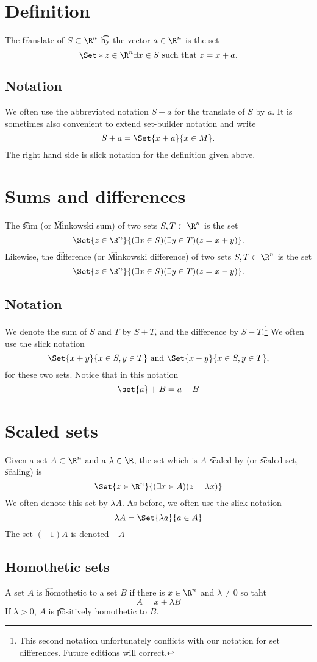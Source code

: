 
\section*{Definition}

The \t{translate} of $S \subset \R ^n$ \t{by} the vector $a \in \R ^n$ is the set
\[
\Set*{z \in \R ^n}{\exists x \in S \text{ such that } z = x + a}.
\]

\subsection*{Notation}

We often use the abbreviated notation $S + a$ for the translate of $S$ by $a$.
It is sometimes also convenient to extend set-builder notation and write
\[
S + a = \Set{x + a}{x \in M}.
\]
The right hand side is slick notation for the definition given above.

\section*{Sums and differences}

The \t{sum} (or \t{Minkowski sum}) of two sets $S, T \subset \R ^n$ is the set
\[
\Set{z \in \R ^n}{(\exists x \in S)(\exists y \in T)(z = x + y)}.
\]
Likewise, the \t{difference} (or \t{Minkowski difference}) of two sets $S, T \subset \R ^n$ is the set
\[
\Set{z \in \R ^n}{(\exists x \in S)(\exists y \in T)(z = x - y)}.
\]

\subsection*{Notation}

We denote the sum of $S$ and $T$ by $S + T$, and the difference by $S - T$.\footnote{This second notation unfortunately conflicts with our notation for set differences.
Future editions will correct.}
We often use the slick notation
\[
\Set{x + y}{x \in S, y \in T} \text{ and } \Set{x - y}{x \in S, y \in T},
\]
for these two sets.
Notice that in this notation
\[
\set{a} + B = a + B
\]

\section*{Scaled sets}

Given a set $A \subset \R ^n$ and a $\lambda  \in \R $, the set which is $A$ \t{scaled by} (or \t{scaled set}, \t{scaling}) is
\[
\Set{z \in \R ^n}{(\exists x \in A)(z = \lambda x)}
\]
We often denote this set by $\lambda A$.
As before, we often use the slick notation
\[
\lambda A = \Set{\lambda a}{a \in A}
\]
The set $(-1)A$ is denoted $-A$

\subsection*{Homothetic sets}

A set $A$ is \t{homothetic} to a set $B$ if there is $x \in \R ^n$ and $\lambda  \neq 0$ so taht
\[
A = x + \lambda B
\]
If $\lambda  > 0$, $A$ is \t{positively homothetic} to $B$.

\blankpage